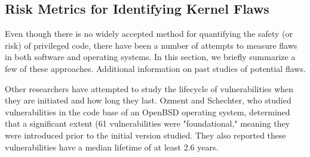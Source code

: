 








\subsection{Risk Metrics for Identifying Kernel Flaws}

Even though there is no widely accepted method for
quantifying the safety (or risk) of privileged code, there have been a number of
attempts to measure flaws in both software and operating systems. In this section,
we briefly summarize a few of these approaches. Additional information on
past studies of potential flaws.



Other researchers have attempted to study the lifecycle of vulnerabilities when they are
initiated and how long they last. Ozment and Schechter, who studied vulnerabilities in the code base of an OpenBSD operating system, determined that a significant extent (61%
vulnerabilities were "foundational," meaning they were introduced prior to the
initial version studied. They also reported these vulnerabilities
have a median lifetime of at least 2.6 years.

